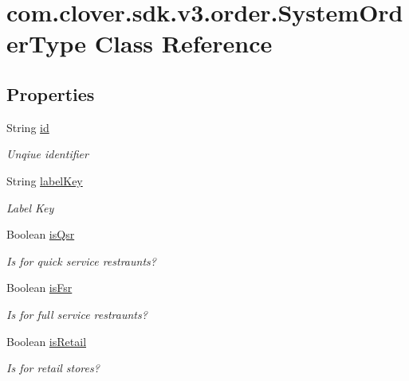 \hypertarget{classcom_1_1clover_1_1sdk_1_1v3_1_1order_1_1_system_order_type}{}\section{com.\+clover.\+sdk.\+v3.\+order.\+System\+Order\+Type Class Reference}
\label{classcom_1_1clover_1_1sdk_1_1v3_1_1order_1_1_system_order_type}
\subsection*{Properties}
\begin{DoxyCompactItemize}
\item 
String \hyperlink{classcom_1_1clover_1_1sdk_1_1v3_1_1order_1_1_system_order_type_a4c02a5cace7700363f060051cba7ed0d}{id}
\begin{DoxyCompactList}\small\item\em Unqiue identifier \end{DoxyCompactList}\item 
String \hyperlink{classcom_1_1clover_1_1sdk_1_1v3_1_1order_1_1_system_order_type_ac7e629fc4063269c972820acdda63448}{label\+Key}
\begin{DoxyCompactList}\small\item\em Label Key \end{DoxyCompactList}\item 
Boolean \hyperlink{classcom_1_1clover_1_1sdk_1_1v3_1_1order_1_1_system_order_type_a3c64e0e51db02ecf273285d0aa342349}{is\+Qsr}
\begin{DoxyCompactList}\small\item\em Is for quick service restraunts? \end{DoxyCompactList}\item 
Boolean \hyperlink{classcom_1_1clover_1_1sdk_1_1v3_1_1order_1_1_system_order_type_ac70c8e924244bef6a7d5224a48b5274d}{is\+Fsr}
\begin{DoxyCompactList}\small\item\em Is for full service restraunts? \end{DoxyCompactList}\item 
Boolean \hyperlink{classcom_1_1clover_1_1sdk_1_1v3_1_1order_1_1_system_order_type_a98dfbeecf7149ab092429139b742f713}{is\+Retail}
\begin{DoxyCompactList}\small\item\em Is for retail stores? \end{DoxyCompactList}\end{DoxyCompactItemize}


